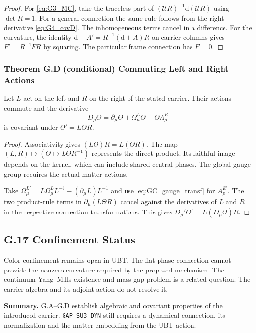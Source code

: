 \begin{proof}
For \eqref{eq:G3_MC}, take the traceless part of
$(\mathcal UR)^{-1}\mathrm d(\mathcal UR)$ using $\det R=1$.
For a general connection the same rule follows from the right derivative
\eqref{eq:G4_covD}. The inhomogeneous terms cancel in a difference.
For the curvature, the identity
$\mathrm d+A'=R^{-1}(\mathrm d+A)R$ on carrier columns gives
$F'=R^{-1}FR$ by squaring. The particular frame connection has $F=0$.
\end{proof}

\subsubsection*{Theorem G.D (conditional) Commuting Left and Right Actions}
\begin{tcolorbox}[colback=blue!3!white,colframe=blue!40!black,title=Theorem G.D (conditional on the stated left/right actions)]
Let $L$ act on the left and $R$ on the right of the stated carrier.
Their actions commute and the derivative
\[
D_\mu\Theta=\partial_\mu\Theta+\Omega_\mu^L\Theta-\Theta A_\mu^R
\]
is covariant under $\Theta'=L\Theta R$.
\end{tcolorbox}

\begin{proof}
Associativity gives $(L\Theta)R=L(\Theta R)$. The map
$(L,R)\mapsto(\Theta\mapsto L\Theta R^{-1})$ represents the direct product.
Its faithful image depends on the kernel, which can include shared
central phases. The global gauge group requires the actual matter actions.

Take $\Omega_\mu^{L'}=L\Omega_\mu^L L^{-1}-(\partial_\mu L)L^{-1}$
and use \eqref{eq:GC_gauge_transf} for $A_\mu^{R'}$. The two product-rule
terms in $\partial_\mu(L\Theta R)$ cancel against the derivatives of $L$
and $R$ in the respective connection transformations. This gives
$D_\mu'\Theta'=L(D_\mu\Theta)R$.
\end{proof}

\subsection*{G.17 Confinement Status}
\label{sec:G17_confinement}
Color confinement remains open in UBT. The flat phase connection cannot
provide the nonzero curvature required by the proposed mechanism.
The continuum Yang--Mills existence and mass gap problem is a related
question. The carrier algebra and its adjoint action do not resolve it.

\textbf{Summary.} G.A--G.D establish algebraic and covariant properties
of the introduced carrier. \texttt{GAP-SU3-DYN} still requires a dynamical
connection, its normalization and the matter embedding from the UBT action.

